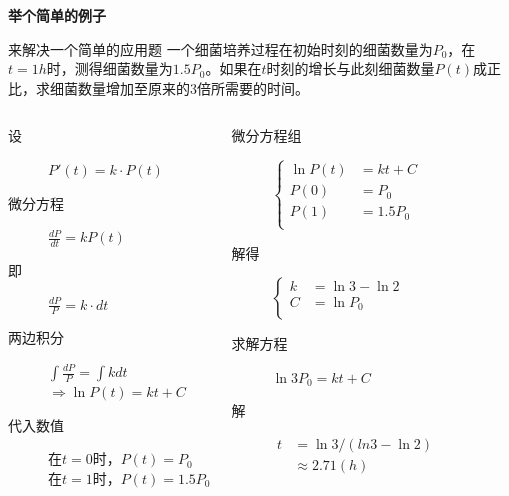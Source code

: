 \documentclass[xcolor={usenames,dvipsnames}]{beamer}
\begin{document}
\begin{frame}{\textbf{举个简单的例子}}
\begin{exampleblock}{来解决一个简单的应用题}
一个细菌培养过程在初始时刻的细菌数量为$P_0$，在$t=1h$时，测得细菌数量为$1.5P_0$。如果在$t$时刻的增长与此刻细菌数量$P(t)$成正比，求细菌数量增加至原来的3倍所需要的时间。
\end{exampleblock}

\begin{columns}
\begin{description}
 \item[设] $P'(t) = k \cdot P(t)$ 
 \item[微分方程] $\frac{{dP}}{{dt}} = kP(t)$
 \item[即]  $\frac{{dP}}{{P}} = k \cdot dt$
 \item[两边积分] $\int {\frac{{dP}}{P} = \int {kdt} } $\\
 $ \Rightarrow \ln P(t) = kt + C$
 \item[代入数值] 在$t=0$时，$P(t)=P_0$\\
 在$t=1$时，$P(t)=1.5P_0$
\end{description}
\begin{description}
	 \item[微分方程组] $
	 \left\{
	 \begin{aligned}
	 \ln P(t) &= kt + C \\
	 P(0)&=P_0 \\
	 P(1)&=1.5P_0 \\
	 \end{aligned}
	 \right.
	 $
	 \item[解得] $
	 \left\{
	 \begin{aligned}
	 k&=\ln 3-\ln 2 \\
	 C&=\ln P_0 \\
	 \end{aligned}
	 \right.
	 $
	 \item[求解方程] $\ln 3P_0 = kt + C$
	 \item[解] $ 
	 \begin{aligned}
	 t&=\ln 3/(ln3 - \ln 2) \\
	  & \approx 2.71 (h)
	 \end{aligned}$
\end{description}
\end{columns}
\end{frame}
\end{document}
